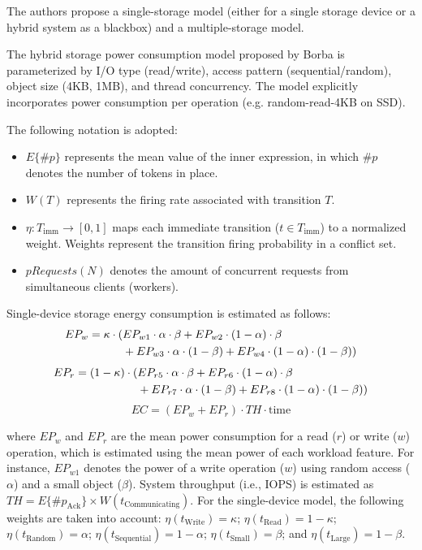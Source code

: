 The authors propose a single-storage model (either for a single storage device or a hybrid system as a blackbox) and a multiple-storage model.

The hybrid storage power consumption model proposed by Borba is parameterized by I/O type (read/write), access pattern (sequential/random), object size (4KB, 1MB), and thread concurrency. The model explicitly incorporates power consumption per operation (e.g. random-read-4KB on SSD).

The following notation is adopted:
\begin{itemize}
    \item $E\{\#p\}$ represents the mean value of the inner expression, in which $\#p$ denotes the number of tokens in place.
    \item $W(T)$ represents the firing rate associated with transition $T$.
    \item $\eta : T_{\text{imm}} \rightarrow [0, 1]$ maps each immediate transition ($t \in T_{\text{imm}}$) to a normalized weight. Weights represent the transition firing probability in a conflict set.
    \item $pRequests(N)$ denotes the amount of concurrent requests from simultaneous clients (workers).
\end{itemize}

Single-device storage energy consumption is estimated as follows:
\begin{align}
    EP_w = \kappa \cdot (&EP_{w1} \cdot \alpha \cdot \beta 
        + EP_{w2} \cdot (1 - \alpha) \cdot \beta \notag \\
        &+ EP_{w3} \cdot \alpha \cdot (1 - \beta) 
        + EP_{w4} \cdot (1 - \alpha) \cdot (1 - \beta))
\end{align}
\begin{align}
    EP_r = (1 - \kappa) \cdot (&EP_{r5} \cdot \alpha \cdot \beta 
        + EP_{r6} \cdot (1 - \alpha) \cdot \beta \notag \\
        &+ EP_{r7} \cdot \alpha \cdot (1 - \beta) 
        + EP_{r8} \cdot (1 - \alpha) \cdot (1 - \beta))
\end{align}
\begin{equation}
    EC = (EP_w + EP_r) \cdot TH \cdot \text{time}
\end{equation}

where $EP_w$ and $EP_r$ are the mean power consumption for a read ($r$) or write ($w$) operation, which is estimated using the mean power of each workload feature. For instance, $EP_{w1}$ denotes the power of a write operation ($w$) using random access ($\alpha$) and a small object ($\beta$). System throughput (i.e., IOPS) is estimated as $TH = E\{\#p_{\text{Ack}}\} \times W(t_{\text{Communicating}})$. For the single-device model, the following weights are taken into account:  
$\eta(t_{\text{Write}}) = \kappa$;  
$\eta(t_{\text{Read}}) = 1 - \kappa$;  
$\eta(t_{\text{Random}}) = \alpha$;  
$\eta(t_{\text{Sequential}}) = 1 - \alpha$;  
$\eta(t_{\text{Small}}) = \beta$; and  
$\eta(t_{\text{Large}}) = 1 - \beta$.

